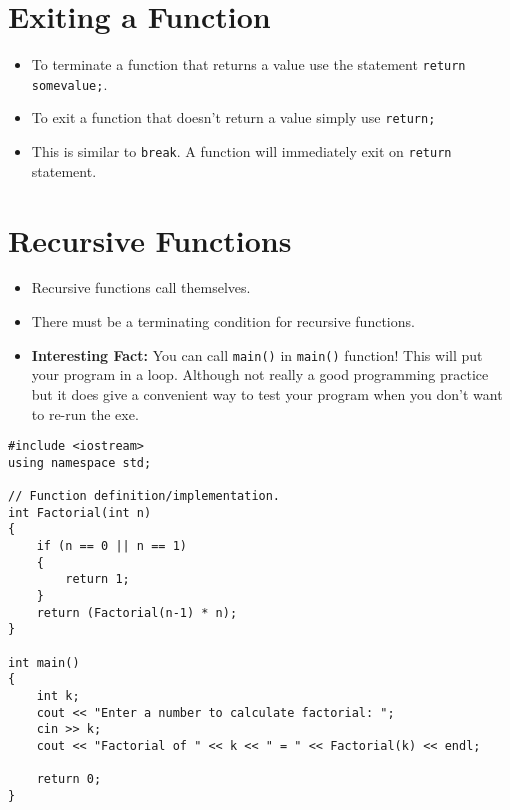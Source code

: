 \documentclass[12pt,a4paper]{article}
\begin{document}
\section{Exiting a Function}
\begin{itemize}
\item To terminate a function that returns a value use the statement \verb|return somevalue;|.
\item To exit a function that doesn't return a value simply use \verb|return;|
\item This is similar to \verb|break|. A function will immediately exit on \verb|return| statement.
\end{itemize}
\section{Recursive Functions}
\begin{itemize}
\item Recursive functions call themselves.
\item There must be a terminating condition for recursive functions.
\item \textbf{Interesting Fact:} You can call \verb|main()| in \verb|main()| function! This will put your program in a loop. Although not really a good programming practice but it does give a convenient way to test your program when you don't want to re-run the exe.
\end{itemize}
\begin{lstlisting}[caption={Recursive Factorial Function}]
#include <iostream>
using namespace std;

// Function definition/implementation.
int Factorial(int n)
{
	if (n == 0 || n == 1)
	{
		return 1;
	}
	return (Factorial(n-1) * n);
}

int main()
{
	int k;
	cout << "Enter a number to calculate factorial: ";
	cin >> k;
	cout << "Factorial of " << k << " = " << Factorial(k) << endl;
	
	return 0;
}
\end{lstlisting}
\end{document}
